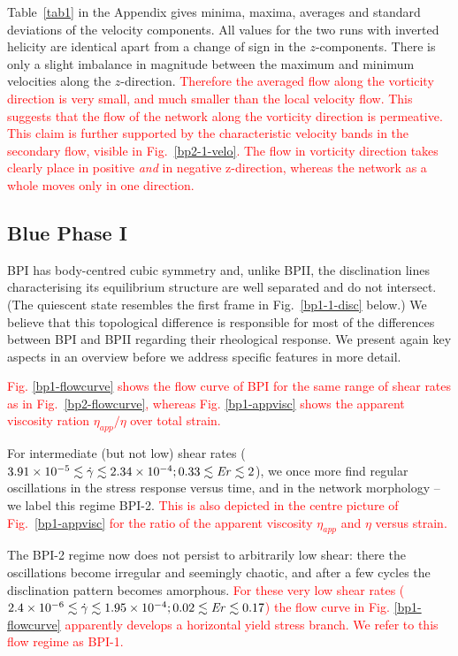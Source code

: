 \documentclass[8.5pt,twoside,twocolumn]{article}
\newcommand{\e}[1]{\times10^{#1}}
\newcommand{\gd}{\dot{\gamma}}
\newcommand{\rev}[1]{{\textcolor{red}{#1}}}
\begin{document}
Table~\ref{tab1} in the Appendix 
gives minima, maxima, averages and standard deviations 
of the velocity components.
All values for the two runs with inverted helicity are identical apart 
from a change of sign in the $z$-components.
There is only a slight imbalance in magnitude 
between the maximum and minimum velocities 
along the $z$-direction. 
\rev{
Therefore the averaged flow along the vorticity
direction is very small, and much smaller than
the local velocity flow. This suggests that the
flow of the network along the vorticity 
direction is permeative. This claim is further supported by the characteristic 
velocity bands in the secondary flow, visible in Fig.~\ref{bp2-1-velo}. 
The flow in vorticity direction takes clearly place in positive {\em and} in negative z-direction, 
whereas the network as a whole moves only in one direction.
} 

\subsection{Blue Phase I}

BPI has body-centred cubic symmetry and, unlike BPII, the disclination lines
characterising its equilibrium structure are well separated and do not 
intersect. (The quiescent state resembles the first frame in Fig.~\ref{bp1-1-disc}
below.)
We believe that this topological difference is responsible for most of
the differences between BPI and BPII regarding their rheological response. 
We present again key aspects in an overview before we address specific features 
in more detail. 

\rev{
Fig. \ref{bp1-flowcurve} shows the flow curve of BPI for the same range of
shear rates as in Fig.~\ref{bp2-flowcurve}, whereas Fig. \ref{bp1-appvisc} shows 
the apparent viscosity ration $\eta_{app}/\eta$ over total strain.
} 

For intermediate (but not low) shear rates
($3.91\e{-5}\lesssim\gd\lesssim 2.34\e{-4}; 0.33\lesssim {\it Er} \lesssim 2$), we once more find regular oscillations in the stress
response versus time, and in the network morphology -- we label this 
regime BPI-2. 
\rev{
This is also depicted in the centre picture of Fig.~\ref{bp1-appvisc} for the
ratio of the apparent viscosity $\eta_{app}$ and $\eta$ versus strain.
}

The BPI-2 regime now does not persist to arbitrarily low shear: there the
oscillations become irregular and seemingly chaotic, and after a few
cycles the disclination pattern becomes amorphous.
\rev{
For these very low shear rates 
($2.4\e{-6}\lesssim\gd\lesssim 1.95\e{-4}; 0.02\lesssim {\it Er} \lesssim 0.17$) 
the flow curve in Fig. \ref{bp1-flowcurve}
apparently develops a horizontal yield stress branch. 
We refer to this flow regime as BPI-1.
}
\end{document}
